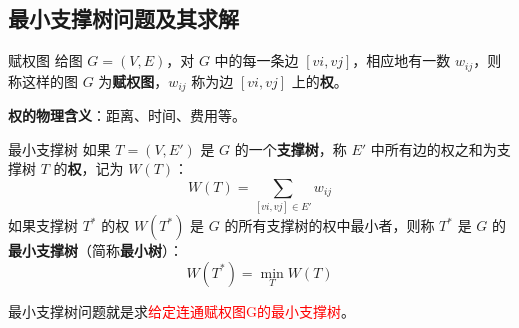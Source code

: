 	\subsection{最小支撑树问题及其求解}
	\begin{dfnbox}{赋权图}
	给图 \( G = (V, E) \)，对 \( G \) 中的每一条边 \([vi, vj]\)，相应地有一数 \( w_{ij} \)，则称这样的图 \( G \) 为\textbf{赋权图}，\( w_{ij} \) 称为边 \([vi, vj]\) 上的\textbf{权}。
	\end{dfnbox}
	\textbf{权的物理含义}：距离、时间、费用等。
	\begin{dfnbox}{最小支撑树}
	如果 \( T = (V, E') \) 是 \( G \) 的一个\textbf{支撑树}，称 \( E' \) 中所有边的权之和为支撑树 \( T \) 的\textbf{权}，记为 \( W(T) \)：
	\[ W(T) = \sum_{[vi,vj]\in E'} w_{ij} \]
	如果支撑树 \( T^* \) 的权 \( W(T^*) \) 是 \( G \) 的所有支撑树的权中最小者，则称 \( T^* \) 是 \( G \) 的\textbf{最小支撑树}（简称\textbf{最小树}）：
	\[ W(T^*) = \min_{T} W(T) \]
	\end{dfnbox}
	最小支撑树问题就是求\textcolor{red}{给定连通赋权图G的最小支撑树}。
